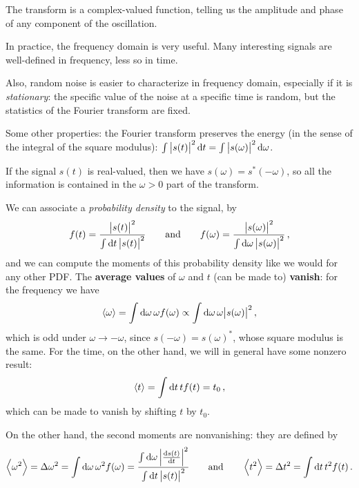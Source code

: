 \documentclass[main.tex]{subfiles}
\begin{document}
The transform is a complex-valued function, telling us the amplitude and phase of any component of the oscillation.

In practice, the frequency domain is very useful. Many interesting signals are well-defined in frequency, less so in time.

Also, random noise is easier to characterize in frequency domain, especially if it is \emph{stationary}: the specific value of the noise at a specific time is random, but the statistics of the Fourier transform are fixed.

Some other properties: the Fourier transform preserves the energy (in the sense of the integral of the square modulus): \(\int \abs{s(t)}^2 \dd{t} = \int \abs{s(\omega )}^2 \dd{\omega }\). 

If the signal \(s(t)\) is real-valued, then we have \(s(\omega ) = s^{*}(- \omega )\), so all the information is contained in the \(\omega > 0\) part of the transform.

We can associate a \emph{probability density} to the signal, by 
%
\begin{align}
f(t) = \frac{\abs{s(t)}^2}{\int \dd{t} \abs{s(t)}^2}
\qquad \text{and} \qquad
f(\omega) = \frac{\abs{s(\omega)}^2}{\int \dd{\omega} \abs{s(\omega)}^2}
\,,
\end{align}
%
and we can compute the moments of this probability density like we would for any other PDF.
The \textbf{average values} of \(\omega \) and \(t\) (can be made to) \textbf{vanish}: for the frequency we have 
%
\begin{align}
\expval{\omega } = \int \dd{\omega } \omega f(\omega )
\propto \int \dd{\omega } \omega \abs{s(\omega )}^2 
\,,
\end{align}
%
which is odd under \(\omega \to - \omega \), since \(s(- \omega ) = s(\omega )^{*}\), whose square modulus is the same. 
For the time, on the other hand, we will in general have some nonzero result:
%
\begin{align}
\expval{t} = \int \dd{t} t f(t) = t_0 
\,,
\end{align}
%
which can be made to vanish by shifting \(t\) by \(t_0 \). 

On the other hand, the second moments are nonvanishing: they are defined by 
%
\begin{align}
\expval{\omega^2} = \Delta \omega^2 = \int \dd{\omega } \omega^2 f(\omega ) = \frac{\int \dd{\omega } \abs{\dv{s(t)}{t}}^2}{\int \dd{t} \abs{s(t)}^2}
\qquad \text{and} \qquad
\expval{t^2} = \Delta t^2 = \int \dd{t } t^2 f(t )
\,.
\end{align}
\end{document}
